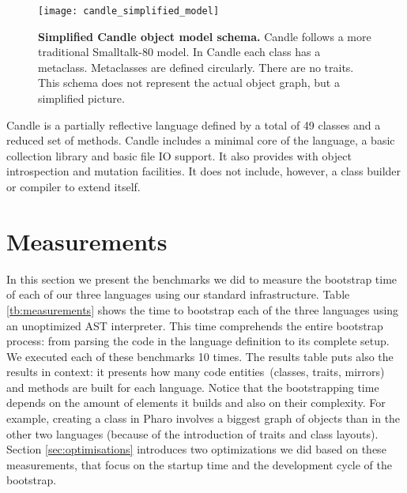 \begin{figure}[ht]
\center
\texttt{[image: candle\_simplified\_model]}
\caption{\textbf{Simplified Candle object model schema.} Candle follows a more traditional Smalltalk-80 model. In Candle each class has a metaclass. Metaclasses are defined circularly. There are no traits. This schema does not represent the actual object graph, but a simplified picture.\label{fig:candle_simplified_model}}
\end{figure}


Candle is a partially reflective language defined by a total of 49 classes and a reduced set of methods. Candle includes a minimal core of the language, a basic collection library and basic file IO support. It also provides with object introspection and mutation facilities. It does not include, however, a class builder or compiler to extend itself.%

\section{Measurements}

In this section we present the benchmarks we did to measure the bootstrap time of each of our three languages using our standard infrastructure. Table \ref{tb:measurements} shows the time to bootstrap each of the three languages using an unoptimized AST interpreter. This time comprehends the entire bootstrap process: from parsing the code in the language definition to its complete setup. We executed each of these benchmarks 10 times. The results table puts also the results in context: it presents how many code entities~(classes, traits, mirrors) and methods are built for each language. Notice that the bootstrapping time depends on the amount of elements it builds and also on their complexity. For example, creating a class in Pharo involves a biggest graph of objects than in the other two languages (because of the introduction of traits and class layouts). Section \ref{sec:optimisations} introduces two optimizations we did based on these measurements, that focus on the startup time and the development cycle of the bootstrap. 

